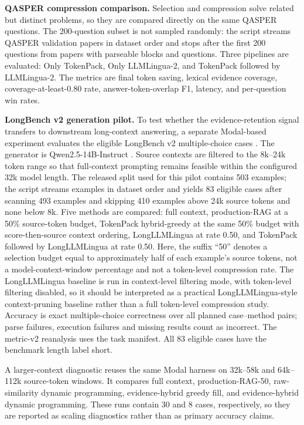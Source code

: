 \documentclass[conference]{IEEEtran}
\begin{document}
\textbf{QASPER compression comparison.} Selection and compression solve related but distinct problems, so they are compared directly on the same QASPER questions. The 200-question subset is not sampled randomly: the script streams QASPER validation papers in dataset order and stops after the first 200 questions from papers with parseable blocks and questions. Three pipelines are evaluated: Only TokenPack, Only LLMLingua-2, and TokenPack followed by LLMLingua-2. The metrics are final token saving, lexical evidence coverage, coverage-at-least-0.80 rate, answer-token-overlap F1, latency, and per-question win rates.

\textbf{LongBench v2 generation pilot.} To test whether the evidence-retention signal transfers to downstream long-context answering, a separate Modal-based experiment evaluates the eligible LongBench v2 multiple-choice cases \cite{bai2024longbench2}. The generator is Qwen2.5-14B-Instruct \cite{qwen2024qwen25}. Source contexts are filtered to the 8k--24k token range so that full-context prompting remains feasible within the configured 32k model length. The released split used for this pilot contains 503 examples; the script streams examples in dataset order and yields 83 eligible cases after scanning 493 examples and skipping 410 examples above 24k source tokens and none below 8k. Five methods are compared: full context, production-RAG at a 50\% source-token budget, TokenPack hybrid-greedy at the same 50\% budget with score-then-source context ordering, LongLLMLingua at rate 0.50, and TokenPack followed by LongLLMLingua at rate 0.50. Here, the suffix ``50'' denotes a selection budget equal to approximately half of each example's source tokens, not a model-context-window percentage and not a token-level compression rate. The LongLLMLingua baseline is run in context-level filtering mode, with token-level filtering disabled, so it should be interpreted as a practical LongLLMLingua-style context-pruning baseline rather than a full token-level compression study. Accuracy is exact multiple-choice correctness over all planned case--method pairs; parse failures, execution failures and missing results count as incorrect. The metric-v2 reanalysis uses the task manifest. All 83 eligible cases have the benchmark length label short.

A larger-context diagnostic reuses the same Modal harness on 32k--58k and 64k--112k source-token windows. It compares full context, production-RAG-50, raw-similarity dynamic programming, evidence-hybrid greedy fill, and evidence-hybrid dynamic programming. These runs contain 30 and 8 cases, respectively, so they are reported as scaling diagnostics rather than as primary accuracy claims.
\end{document}
